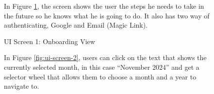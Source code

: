 \begin{figure}[!h]
\begin{minipage}{0.3\textwidth}
        \caption{UI Screen 1: Onboarding View}
        \label{fig:ui-screen-1}
    \end{minipage}
    \hfill
    \begin{minipage}{0.65\textwidth}
        In Figure \ref{fig:ui-screen-1}, the screen shows the user the steps he needs to take in the future so he knows what he is going to do. It also has two way of authenticating, Google and Email (Magic Link).
    \end{minipage}
\end{figure}

\begin{figure}[!h]
    \begin{minipage}{0.65\textwidth}
        In Figure \ref{fig:ui-screen-2}, users can click on the text that shows the currently selected month, in this case ``November 2024'' and get a selector wheel that allows them to choose a month and a year to navigate to.
    \end{minipage}
    \hfill
    \begin{minipage}{0.3\textwidth}
        \centering

\end{minipage}
\end{figure}
